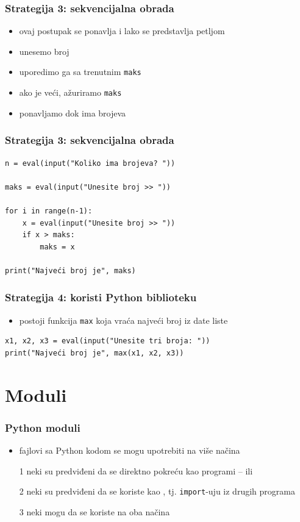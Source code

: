 \documentclass[utf8,compress,aspectratio=169]{beamer}
\begin{document}
\begin{frame}[fragile]
  \frametitle{Strategija 3: sekvencijalna obrada}
  \begin{itemize}
    \item ovaj postupak se ponavlja i lako se predstavlja petljom
    \item unesemo broj
    \item uporedimo ga sa trenutnim \texttt{maks}
    \item ako je veći, ažuriramo \texttt{maks}
    \item ponavljamo dok ima brojeva
  \end{itemize}
\end{frame}

\begin{frame}[fragile]
  \frametitle{Strategija 3: sekvencijalna obrada}
\begin{verbatim}
n = eval(input("Koliko ima brojeva? "))

maks = eval(input("Unesite broj >> "))

for i in range(n-1):
    x = eval(input("Unesite broj >> "))
    if x > maks:
        maks = x

print("Najveći broj je", maks)
\end{verbatim}
\end{frame}

\begin{frame}[fragile]
  \frametitle{Strategija 4: koristi Python biblioteku}
  \begin{itemize}
    \item postoji funkcija \texttt{max} koja vraća najveći broj iz date liste
  \end{itemize}
\begin{verbatim}
x1, x2, x3 = eval(input("Unesite tri broja: "))
print("Najveći broj je", max(x1, x2, x3))
\end{verbatim}
\end{frame}

\section{Moduli}

\begin{frame}[fragile]
  \frametitle{Python moduli}
  \begin{itemize}
    \item fajlovi sa Python kodom se mogu upotrebiti na više načina
    \item[1] neki su predviđeni da se direktno pokreću kao programi --  ili 
    \item[2] neki su predviđeni da se koriste kao , tj. \texttt{import}-uju iz drugih programa
    \item[3] neki mogu da se koriste na oba načina
  \end{itemize}
\end{frame}
\end{document}
